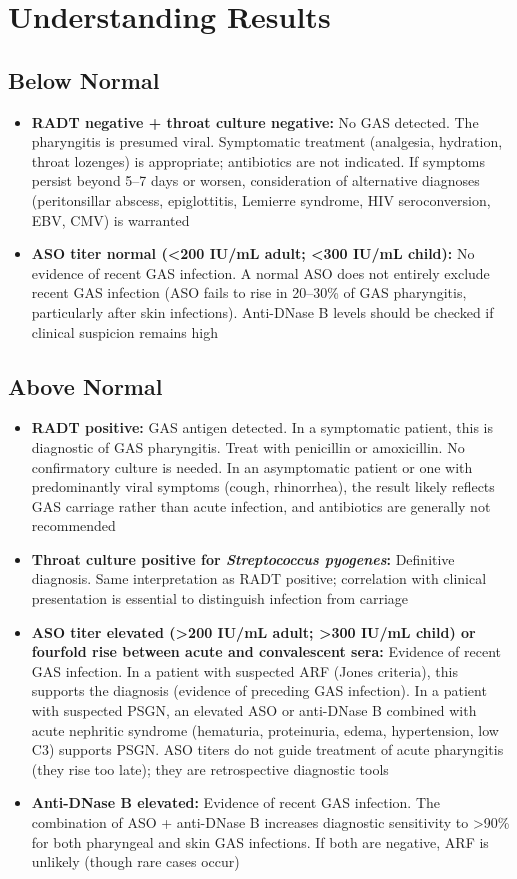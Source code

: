 \section*{Understanding Results}

\subsection*{Below Normal}
\begin{itemize}
  \item \textbf{RADT negative + throat culture negative:} No GAS detected. The pharyngitis is presumed viral. Symptomatic treatment (analgesia, hydration, throat lozenges) is appropriate; antibiotics are not indicated. If symptoms persist beyond 5--7 days or worsen, consideration of alternative diagnoses (peritonsillar abscess, epiglottitis, Lemierre syndrome, HIV seroconversion, EBV, CMV) is warranted
  \item \textbf{ASO titer normal (<200 IU/mL adult; <300 IU/mL child):} No evidence of recent GAS infection. A normal ASO does not entirely exclude recent GAS infection (ASO fails to rise in 20--30\% of GAS pharyngitis, particularly after skin infections). Anti-DNase B levels should be checked if clinical suspicion remains high
\end{itemize}

\subsection*{Above Normal}
\begin{itemize}
  \item \textbf{RADT positive:} GAS antigen detected. In a symptomatic patient, this is diagnostic of GAS pharyngitis. Treat with penicillin or amoxicillin. No confirmatory culture is needed. In an asymptomatic patient or one with predominantly viral symptoms (cough, rhinorrhea), the result likely reflects GAS carriage rather than acute infection, and antibiotics are generally not recommended
  \item \textbf{Throat culture positive for \textit{Streptococcus pyogenes}:} Definitive diagnosis. Same interpretation as RADT positive; correlation with clinical presentation is essential to distinguish infection from carriage
  \item \textbf{ASO titer elevated (>200 IU/mL adult; >300 IU/mL child) or fourfold rise between acute and convalescent sera:} Evidence of recent GAS infection. In a patient with suspected ARF (Jones criteria), this supports the diagnosis (evidence of preceding GAS infection). In a patient with suspected PSGN, an elevated ASO or anti-DNase B combined with acute nephritic syndrome (hematuria, proteinuria, edema, hypertension, low C3) supports PSGN. ASO titers do not guide treatment of acute pharyngitis (they rise too late); they are retrospective diagnostic tools
  \item \textbf{Anti-DNase B elevated:} Evidence of recent GAS infection. The combination of ASO + anti-DNase B increases diagnostic sensitivity to >90\% for both pharyngeal and skin GAS infections. If both are negative, ARF is unlikely (though rare cases occur)
\end{itemize}

